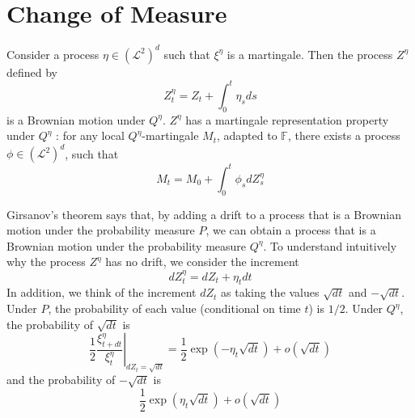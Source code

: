 \documentclass[\topdir/lecture\_notes.tex]{subfiles}
\begin{document}

\section{Change of Measure}
\begin{theorem}\label{thm: thm_273} 
Consider a process \(\eta \in\left(\mathcal{L}^{2}\right)^{d}\) such that \(\xi^{\eta}\) is a martingale. Then the process \(Z^{\eta}\) defined by
\begin{equation}
Z_{t}^{\eta}=Z_{t}+\int_{0}^{t} \eta_{s} d s \label{2.7.3}
\end{equation}
is a Brownian motion under \(Q^{\eta}\).
\(Z^{\eta}\) has a martingale representation property under \(Q^{\eta}\) : for any local \(Q^{\eta}\)-martingale \(M_{t}\), adapted to \(\mathbb{F}\), there exists a process \(\phi \in\left(\mathcal{L}^{2}\right)^{d}\), such that
\begin{equation*}
M_{t}=M_{0}+\int_{0}^{t} \phi_{s} d Z_{s}^{\eta}
\end{equation*}
\end{theorem}
Girsanov's theorem says that, by adding a drift to a process that is a Brownian motion under the probability measure \(P\), we can obtain a process that is a Brownian motion under the probability measure \(Q^{\eta}\). To understand intuitively why the process \(Z^{\eta}\) has no drift, we consider the increment
\begin{equation*}
d Z_{t}^{\eta}=d Z_{t}+\eta_{t} d t
\end{equation*}
In addition, we think of the increment \(d Z_{t}\) as taking the values \(\sqrt{d t}\) and \(-\sqrt{d t}\). Under \(P\), the probability of each value (conditional on time \(t\)) is \(1 / 2\). Under \(Q^{\eta}\), the probability of \(\sqrt{d t}\) is
\begin{equation*}
\left.\frac{1}{2} \frac{\xi_{t+d t}^{\eta}}{\xi_{t}^{\eta}}\right|_{d Z_{t}=\sqrt{d t}}=\frac{1}{2} \exp \left(-\eta_{t} \sqrt{d t}\right)+o(\sqrt{d t})
\end{equation*}
and the probability of \(-\sqrt{d t}\) is
\begin{equation*}
\frac{1}{2} \exp \left(\eta_{t} \sqrt{d t}\right)+o(\sqrt{d t})
\end{equation*}
\end{document}
